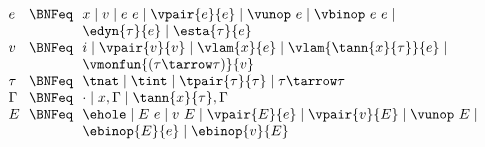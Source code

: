 \begin{flushleft}

\\
$\begin{array}{l@{~~}c@{~~}l}
  e & \BNFeq & x \mid v \mid e~e \mid \vpair{e}{e} \mid \vunop~e \mid \vbinop~e~e \mid
\\ & & \edyn{\tau}{e} \mid \esta{\tau}{e}
\\
  v & \BNFeq & i \mid \vpair{v}{v} \mid \vlam{x}{e} \mid \vlam{\tann{x}{\tau}}{e} \mid
\\ & & \vmonfun{(\tau\tarrow\tau)}{v}
\\
  \tau & \BNFeq & \tnat \mid \tint \mid \tpair{\tau}{\tau} \mid \tau \tarrow \tau
\\
  \Gamma & \BNFeq & \cdot \mid x,\Gamma \mid \tann{x}{\tau},\Gamma
\\
  E & \BNFeq & \ehole \mid E~e \mid v~E \mid
                  \vpair{E}{e} \mid \vpair{v}{E} \mid \vunop~E \mid
\\ & &            \ebinop{E}{e} \mid \ebinop{v}{E}
\end{array}$





\end{flushleft}
